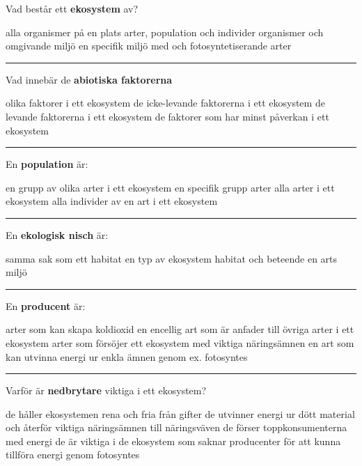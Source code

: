 \documentclass{exam}
\begin{document}
\begin{questions}
\question Vad består ett \textbf{ekosystem} av? 
\begin{checkboxes}
   \choice alla organismer på en plats
   \choice arter, population och individer
   \correctchoice organismer och omgivande miljö
   \choice en specifik miljö med och fotosyntetiserande arter 
\end{checkboxes}

\vspace{5mm} 
\hrule 
\vspace{5mm} 
\question Vad innebär de \textbf{abiotiska faktorerna}
\begin{checkboxes}
   \choice olika faktorer i ett ekosystem
   \correctchoice de icke-levande faktorerna i ett ekosystem
   \choice de levande faktorerna i ett ekosystem
   \choice de faktorer som har minst påverkan i ett ekosystem
\end{checkboxes}

\vspace{5mm} 
\hrule 
\vspace{5mm} 
\question En \textbf{population} är:
\begin{checkboxes}
   \choice en grupp av olika arter i ett ekosystem
   \choice en specifik grupp arter
   \choice alla arter i ett ekosystem
   \correctchoice alla individer av en art i ett ekosystem 
\end{checkboxes}

\vspace{5mm} 
\hrule 
\vspace{5mm} 
\question En \textbf{ekologisk nisch} är:
\begin{checkboxes}
   \choice samma sak som ett habitat
   \choice en typ av ekosystem
   \correctchoice habitat och beteende
   \choice en arts miljö 
\end{checkboxes}

\vspace{5mm} 
\hrule 
\vspace{5mm} 
\question En \textbf{producent} är:
\begin{checkboxes}
   \choice arter som kan skapa koldioxid
   \choice en encellig art som är anfader till övriga arter i ett ekosystem
   \choice arter som försöjer ett ekosystem med viktiga näringsämnen
   \correctchoice en art som kan utvinna energi ur enkla ämnen genom ex. fotosyntes
\end{checkboxes}

\vspace{5mm} 
\hrule 
\vspace{5mm} 
\question Varför är \textbf{nedbrytare} viktiga i ett ekosystem?
\begin{checkboxes}
   \choice de håller ekosystemen rena och fria från gifter
   \correctchoice de utvinner energi ur dött material och återför viktiga näringsämnen till näringsväven
   \choice de förser toppkonsumenterna med energi
   \choice de är viktiga i de ekosystem som saknar producenter för att kunna tillföra energi genom fotosyntes
\end{checkboxes}
\break


\end{questions}
\end{document}
